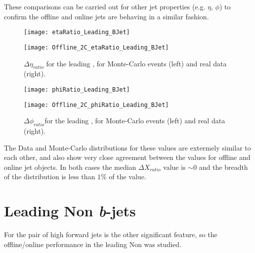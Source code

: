 		These comparisons can be carried out for other jet properties (e.g. $\eta$, $\phi$) to confirm the offline and online jets are behaving in a similar fashion.
		
		\begin{figure}[h]
			\centering
			\begin{minipage}[h]{0.33\linewidth}
				\texttt{[image: etaRatio\_Leading\_BJet]}
				
			\end{minipage}
			\quad
			\begin{minipage}[h]{0.33\linewidth}
				\texttt{[image: Offline\_2C\_etaRatio\_Leading\_BJet]}
			\end{minipage}
			\caption{$\Delta \eta_{ratio}$ for the leading \bjet, for Monte-Carlo events (left) and real data (right).}
			\label{fig:O:leadingbeta}
		\end{figure}
		
		\begin{figure}[h]
			\centering
			\begin{minipage}[h]{0.33\linewidth}
				\texttt{[image: phiRatio\_Leading\_BJet]}
				
			\end{minipage}
			\quad
			\begin{minipage}[h]{0.33\linewidth}
				\texttt{[image: Offline\_2C\_phiRatio\_Leading\_BJet]}
			\end{minipage}
			\caption{$\Delta \phi_{ratio}$for the leading \bjet, for Monte-Carlo events (left) and real data (right).}
			\label{fig:O:leadingbphi}
		\end{figure}
		
		The Data and Monte-Carlo distributions for these values are extermely similar to each other, and also show very close agreement between the values for offline and online jet objects. In both cases the median $\Delta X_{ratio}$ value is $\sim0$ and the breadth of the distribution is less than $1\%$ of the value. 
		

\newpage
\section{Leading Non \textit{b}-jets}
	\label{OP:leadingnonb}
	
	For \VBFHBB the pair of high \pt forward jets is the other significant feature, so the offline/online performance in the leading Non \bjet was studied.
	
	
